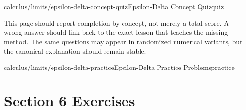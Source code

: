 \begin{webpage}{calculus/limits/epsilon-delta-concept-quiz}{Epsilon-Delta Concept Quiz}{quiz}
\begin{bgsummary}[title={Quiz use on the website}]
This page should report completion by concept, not merely a total score. A wrong answer should link back to the exact lesson that teaches the missing method. The same questions may appear in randomized numerical variants, but the canonical explanation should remain stable.
\end{bgsummary}
\end{webpage}

\begin{webpage}{calculus/limits/epsilon-delta-practice}{Epsilon-Delta Practice Problems}{practice}
\section*{Section 6 Exercises}


\end{webpage}

